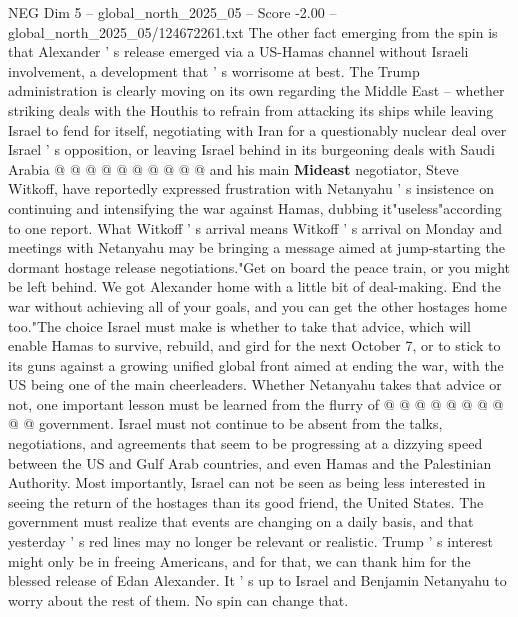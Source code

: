 \begin{textsample}{NEG Dim 5 – global\_north\_2025\_05 – Score -2.00 – global\_north\_2025\_05/124672261.txt}
The other fact emerging from the spin is that Alexander ' s release emerged via a US-Hamas channel without Israeli involvement, a development that ' s worrisome at best.
The Trump administration is clearly moving on its own regarding the Middle East -- whether striking deals with the Houthis to refrain from attacking its ships while leaving Israel to fend for itself, negotiating with Iran for a questionably nuclear deal over Israel ' s opposition, or leaving Israel behind in its burgeoning deals with Saudi Arabia @ @ @ @ @ @ @ @ @ @ and his main \textbf{Mideast} negotiator, Steve Witkoff, have reportedly expressed frustration with Netanyahu ' s insistence on continuing and intensifying the war against Hamas, dubbing it"useless"according to one report.
What Witkoff ' s arrival means Witkoff ' s arrival on Monday and meetings with Netanyahu may be bringing a message aimed at jump-starting the dormant hostage release negotiations."Get on board the peace train, or you might be left behind.
We got Alexander home with a little bit of deal-making.
End the war without achieving all of your goals, and you can get the other hostages home too."The choice Israel must make is whether to take that advice, which will enable Hamas to survive, rebuild, and gird for the next October 7, or to stick to its guns against a growing unified global front aimed at ending the war, with the US being one of the main cheerleaders.
Whether Netanyahu takes that advice or not, one important lesson must be learned from the flurry of @ @ @ @ @ @ @ @ @ @ government.
Israel must not continue to be absent from the talks, negotiations, and agreements that seem to be progressing at a dizzying speed between the US and Gulf Arab countries, and even Hamas and the Palestinian Authority.
Most importantly, Israel can not be seen as being less interested in seeing the return of the hostages than its good friend, the United States.
The government must realize that events are changing on a daily basis, and that yesterday ' s red lines may no longer be relevant or realistic.
Trump ' s interest might only be in freeing Americans, and for that, we can thank him for the blessed release of Edan Alexander.
It ' s up to Israel and Benjamin Netanyahu to worry about the rest of them.
No spin can change that.

\end{textsample}
